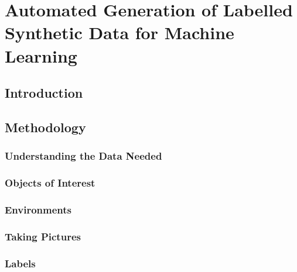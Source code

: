 \documentclass[12pt]{article}
\begin{document}

\section{Automated Generation of Labelled Synthetic Data for Machine Learning}

\subsection{Introduction}



\subsection{Methodology}

\subsubsection{Understanding the Data Needed}

\subsubsection{Objects of Interest}

\subsubsection{Environments}

\subsubsection{Taking Pictures}


\subsubsection{Labels}
\end{document}
